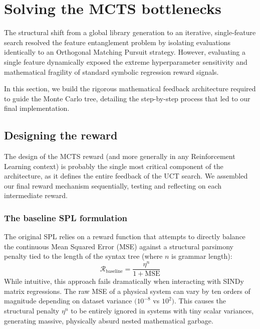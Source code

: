 \documentclass[11pt, a4paper]{article}
\begin{document}
\section{Solving the MCTS bottlenecks}
\label{sec:mcts_bottlenecks}

The structural shift from a global library generation to an iterative, single-feature search resolved the feature entanglement problem by isolating evaluations identically to an Orthogonal Matching Pursuit strategy. However, evaluating a single feature dynamically exposed the extreme hyperparameter sensitivity and mathematical fragility of standard symbolic regression reward signals. 

In this section, we build the rigorous mathematical feedback architecture required to guide the Monte Carlo tree, detailing the step-by-step process that led to our final implementation.

\subsection{Designing the reward}

The design of the MCTS reward (and more generally in any Reinforcement Learning context) is probably the single most critical component of the architecture, as it defines the entire feedback of the UCT search. We assembled our final reward mechanism sequentially, testing and reflecting on each intermediate reward.

\newpage
\subsubsection{The baseline SPL formulation}
The original SPL \cite{sun2023spl} relies on a reward function that attempts to directly balance the continuous Mean Squared Error (MSE) against a structural parsimony penalty tied to the length of the syntax tree (where $n$ is grammar length):
\begin{equation}
    \mathcal{R}_{\text{baseline}} = \frac{\eta^n}{1 + \text{MSE}}
\end{equation}
While intuitive, this approach fails dramatically when interacting with SINDy matrix regressions. The raw MSE of a physical system can vary by ten orders of magnitude depending on dataset variance $(10^{-8}$ vs $10^2)$. This causes the structural penalty $\eta^n$ to be entirely ignored in systems with tiny scalar variances, generating massive, physically absurd nested mathematical garbage.

\vspace{0.3cm}
\end{document}
